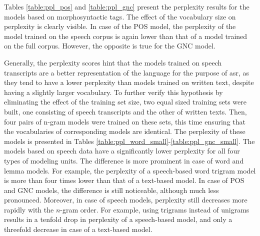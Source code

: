 Tables \ref{table:ppl_pos} and \ref{table:ppl_gnc} present the perplexity results for the models based on morphosyntactic tags. The effect of the vocabulary size on perplexity is clearly visible. In case of the POS model, the perplexity of the model trained on the speech corpus is again lower than that of a model trained on the full corpus. However, the opposite is true for the GNC model. 

Generally, the perplexity scores hint that the models trained on speech transcripts are a better representation of the language for the purpose of \gls{asr}, as they tend to have a lower perplexity than models trained on written text, despite having a slightly larger vocabulary. To further verify this hypothesis by eliminating the effect of the training set size, two equal sized training sets were built, one consisting of speech transcripts and the other of written texts. Then, four pairs of \mbox{n-gram} models were trained on these sets, this time ensuring that the vocabularies of corresponding models are identical. The perplexity of these models is presented in Tables \mbox{\ref{table:ppl_word_small}-\ref{table:ppl_gnc_small}}. The models based on speech data have a significantly lower perplexity for all four types of modeling units. The difference is more prominent in case of word and lemma models. For example, the perplexity of a \mbox{speech-based} word trigram model is more than four times lower than that of a \mbox{text-based} model. In case of POS and GNC models, the difference is still noticeable, although much less pronounced. Moreover, in case of speech models, perplexity still decreases more rapidly with the \mbox{$n$-gram} order. For example, using trigrams instead of unigrams results in a tenfold drop in perplexity of a \mbox{speech-based} model, and only a threefold decrease in case of a \mbox{text-based} model. 

